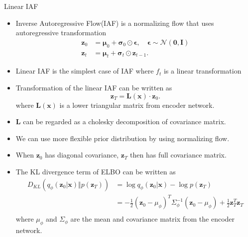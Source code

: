 \documentclass{beamer}
\begin{document}
\begin{frame}[allowframebreaks]{Linear IAF}
    \begin{itemize}
        \item Inverse Autoregressive Flow(IAF) is a normalizing flow that uses autoregressive transformation \cite{kingma2016iaf}
        \begin{align*}
            \mathbf z_0 &= \mathbf \mu_0 + \mathbf \sigma_0 \odot \mathbf \epsilon, \quad \mathbf \epsilon \sim \mathcal N(\mathbf 0, \mathbf I) \\
            \mathbf z_t &= \mathbf \mu_t + \mathbf \sigma_t \odot \mathbf z_{t-1}.
        \end{align*}
        \item Linear IAF is the simplest case of IAF where $f_t$ is a linear transformation
        \item Transformation of the linear IAF can be written as
        \begin{equation*}
            \mathbf{z}_T = \mathbf{L(x)} \cdot \mathbf{z}_0.
        \end{equation*}
        where $\mathbf{L(x)}$ is a lower triangular matrix from encoder network.
        \framebreak
        \item $\mathbf L$ can be regarded as a cholesky decomposition of covariance matrix.
        \item We can use more flexible prior distribution by using normalizing flow.
        \item When $\mathbf z_0$ has diagonal covariance, $\mathbf z_T$ then has full covariance matrix.
        \item The KL divergence term of ELBO can be written as
        \begin{equation*}
            \begin{aligned}
                D_{KL}(q_\phi(\mathbf{z}_0 | \mathbf{x}) \Vert p(\mathbf{z}_T)) &=
                \log q_\phi(\mathbf{z}_0 | \mathbf{x}) - \log p(\mathbf{z}_T) \\
                &= -\frac{1}{2}(\mathbf{z}_0 -\mu_\phi)^T\Sigma_\phi^{-1}(\mathbf{z}_0 -\mu_\phi) + \frac{1}{2}\mathbf{z}_T^T\mathbf{z}_T \\
            \end{aligned}
        \end{equation*}
        where $\mu_\phi$ and $\Sigma_\phi$ are the mean and covariance matrix from the encoder network.
    \end{itemize}
\end{frame}
\end{document}
